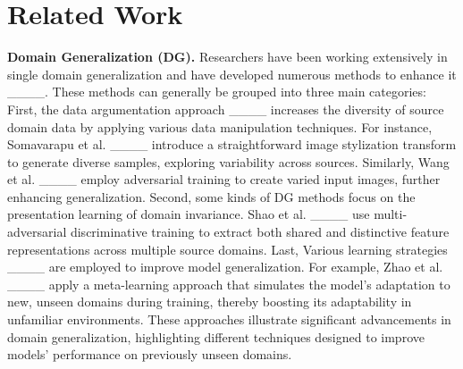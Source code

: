 \section{Related Work}
\label{sec:Work}

\textbf{Domain Generalization (DG).} Researchers have been working extensively in single domain generalization and have developed numerous methods to enhance it ____. These methods can generally be grouped into three main categories: First, the data argumentation approach ____ increases the diversity of source domain data by applying various data manipulation techniques. For instance, Somavarapu et al. ____ introduce a straightforward image stylization transform to generate diverse samples, exploring variability across sources. Similarly, Wang et al. ____ employ adversarial training to create varied input images, further enhancing generalization. Second, some kinds of DG methods focus on the presentation learning of domain invariance. Shao et al. ____ use multi-adversarial discriminative training to extract both shared and distinctive feature representations across multiple source domains. Last, Various learning strategies ____ are employed to improve model generalization. For example, Zhao et al. ____ apply a meta-learning approach that simulates the model’s adaptation to new, unseen domains during training, thereby boosting its adaptability in unfamiliar environments. These approaches illustrate significant advancements in domain generalization, highlighting different techniques designed to improve models' performance on previously unseen domains.

